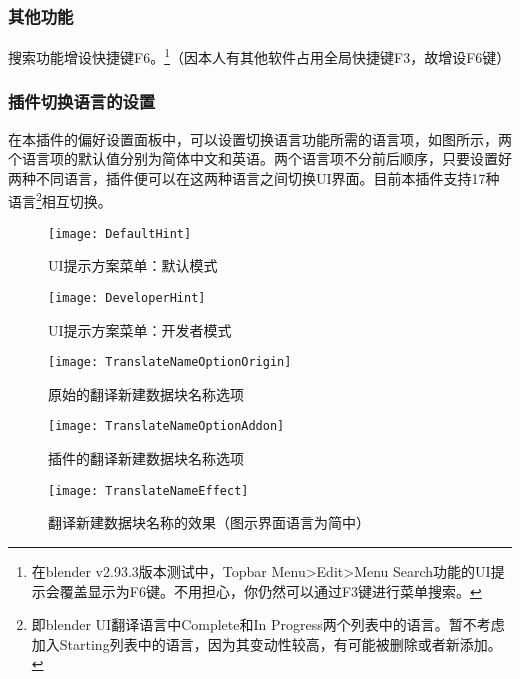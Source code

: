 \documentclass{../../PublicResources/DocClass}
\begin{document}
\subsubsection{其他功能}
搜索功能增设快捷键F6。\footnote{在blender v2.93.3版本测试中，Topbar Menu>Edit>Menu Search功能的UI提示会覆盖显示为F6键。不用担心，你仍然可以通过F3键进行菜单搜索。}（因本人有其他软件占用全局快捷键F3，故增设F6键）

\subsubsection{插件切换语言的设置}
在本插件的偏好设置面板中，可以设置切换语言功能所需的语言项，如图所示，两个语言项的默认值分别为简体中文和英语。两个语言项不分前后顺序，只要设置好两种不同语言，插件便可以在这两种语言之间切换UI界面。目前本插件支持17种语言\footnote{即blender UI翻译语言中Complete和In Progress两个列表中的语言。暂不考虑加入Starting列表中的语言，因为其变动性较高，有可能被删除或者新添加。}相互切换。

\begin{figure}[h!]
    \begin{minipage}[t]{0.47\textwidth}
        \texttt{[image: DefaultHint]}
        \caption{UI提示方案菜单：默认模式}
        \label{默认提示方案}
    \end{minipage}
    \quad
    \begin{minipage}[t]{0.47\textwidth}
        \texttt{[image: DeveloperHint]}
        \caption{UI提示方案菜单：开发者模式}
        \label{开发者提示方案}
    \end{minipage}

    \vspace{1ex}

    \begin{minipage}[t]{0.47\textwidth}
        \texttt{[image: TranslateNameOptionOrigin]}
        \caption{原始的翻译新建数据块名称选项}
        \label{原始的翻译名称选项}
    \end{minipage}
    \quad
    \begin{minipage}[t]{0.47\textwidth}
        \texttt{[image: TranslateNameOptionAddon]}
        \caption{插件的翻译新建数据块名称选项}
        \label{插件的翻译名称选项}
    \end{minipage}

    \vspace{1ex}

    \texttt{[image: TranslateNameEffect]}
    \caption{翻译新建数据块名称的效果（图示界面语言为简中）}
    \label{翻译名称的效果}
\end{figure}
\end{document}
